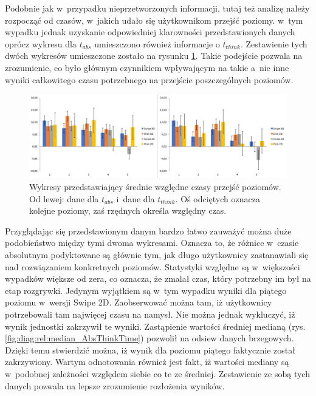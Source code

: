\documentclass[a4paper,12pt,numbers=noenddot]{report}
\begin{document}
Podobnie jak w~przypadku nieprzetworzonych informacji, tutaj też analizę należy rozpocząć od czasów, w~jakich udało się użytkownikom przejść poziomy. w~tym wypadku jednak uzyskanie odpowiedniej klarowności przedstawionych danych oprócz wykresu dla $t_{abs}$ umieszczono również informacje o $t_{think}$. Zestawienie tych dwóch wykresów umieszczone zostało na rysunku \ref{fig:diag:rel:mean_AbsThinkTime}. Takie podejście pozwala na zrozumienie, co było głównym czynnikiem wpływającym na takie a~nie inne wyniki całkowitego czasu potrzebnego na przejście poszczególnych poziomów.

\begin{figure}[h!]
	\centering
  	\includegraphics[width=\linewidth]{diag/rel_mean_absThinkTime.png}
	\caption{Wykresy przedstawiający średnie względne czasy przejść poziomów. Od lewej: dane dla $t_{abs}$ i~dane dla $t_{think}$. Oś odciętych oznacza kolejne poziomy, zaś rzędnych określa względny czas.}
	\label{fig:diag:rel:mean_AbsThinkTime}
\end{figure}

Przyglądając się przedstawionym danym bardzo łatwo zauważyć można duże podobieństwo między tymi dwoma wykresami. Oznacza to, że różnice w~czasie absolutnym podyktowane są głównie tym, jak długo użytkownicy zastanawiali się nad rozwiązaniem konkretnych poziomów. Statystyki względne są w~większości wypadków większe od zera, co oznacza, że zmalał czas, który potrzebny im był na etap rozgrywki. Jedynym wyjątkiem są w~tym wypadku wyniki dla piątego poziomu w~wersji Swipe 2D. Zaobserwować można tam, iż użytkownicy potrzebowali tam najwięcej czasu na namysł. Nie można jednak wykluczyć, iż wynik jednostki zakrzywił te wyniki. Zastąpienie wartości średniej medianą (rys. \ref{fig:diag:rel:median_AbsThinkTime}) pozwolił na odsiew danych brzegowych. Dzięki temu stwierdzić można, iż wynik dla poziomu piątego faktycznie został zakrzywiony. Wartym odnotowania również jest fakt, iż wartości mediany są w~podobnej zależności względem siebie co te ze średniej. Zestawienie ze sobą tych danych pozwala na lepsze zrozumienie rozłożenia wyników.
\end{document}
